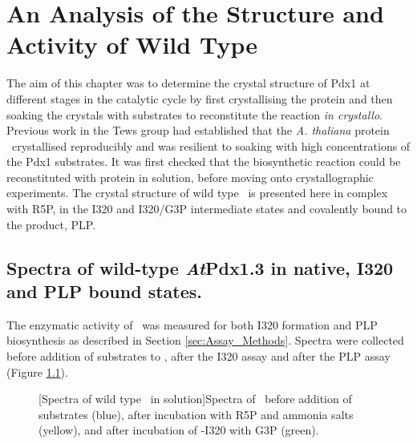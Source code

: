 \chapter{An Analysis of the Structure and Activity of Wild Type \atpdx}\label{ch:WT_Results}

The aim of this chapter was to determine the crystal structure of Pdx1 at different stages in the catalytic cycle by first crystallising the protein and then soaking the crystals with substrates to reconstitute the reaction \textit{in crystallo}. Previous work in the Tews group had established that the \textit{A. thaliana} protein \atpdx ~crystallised reproducibly and was resilient to soaking with high concentrations of the Pdx1 substrates. It was first checked that the biosynthetic reaction could be reconstituted with protein in solution, before moving onto crystallographic experiments. The crystal structure of wild type \atpdx ~is presented here in complex with R5P, in the I320 and I320/G3P intermediate states and covalently bound to the product, PLP.   

\section{Spectra of wild-type \textit{At}Pdx1.3 in native, I320 and PLP bound states.}
The enzymatic activity of \atpdx ~was measured for both I320 formation and PLP biosynthesis as described in Section \ref{sec:Assay_Methods}. Spectra were collected before addition of substrates to \atpdx, after the I320 assay and after the PLP assay (Figure \ref{fig:Pdx1WT_WLspec_raw}). 

\begin{figure}[!htbp]
\centering

	[Spectra of wild type \atpdx ~in solution]{Spectra of \atpdx ~before addition of substrates (blue), after incubation with R5P and ammonia salts (yellow), and after incubation of \atpdx -I320 with G3P (green).\label{fig:Pdx1WT_WLspec_raw}}	
\end{figure}

